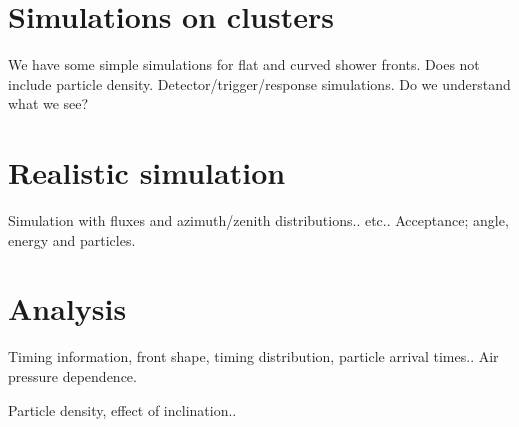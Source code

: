 \section{Simulations on clusters}

We have some simple simulations for flat and curved shower fronts.
Does not include particle density.
Detector/trigger/response simulations. Do we understand what we see?


\section{Realistic simulation}

Simulation with fluxes and azimuth/zenith distributions..
etc..
Acceptance; angle, energy and particles.


\section{Analysis}


Timing information, front shape, timing distribution, particle arrival times..
Air pressure dependence.

Particle density, effect of inclination..
